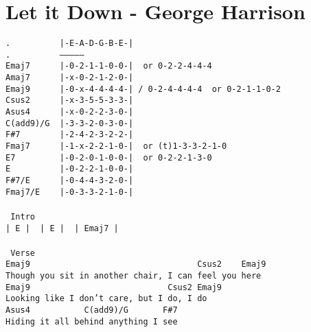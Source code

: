 \newpage
\section{Let it Down - George Harrison}
\label{Let it Down - George Harrison}
\texttt{.\ \ \ \ \ \ \ \ \ \ |-E-A-D-G-B-E-|\\
.\ \ \ \ \ \ \ \ \ \ ---------------\\
Emaj7\ \ \ \ \ \ |-0-2-1-1-0-0-|\ \ or\ 0-2-2-4-4-4\\
Amaj7\ \ \ \ \ \ |-x-0-2-1-2-0-|\\
Emaj9\ \ \ \ \ \ |-0-x-4-4-4-4-|\ /\ 0-2-4-4-4-4\ \ or\ 0-2-1-1-0-2\\
Csus2\ \ \ \ \ \ |-x-3-5-5-3-3-|\\
Asus4\ \ \ \ \ \ |-x-0-2-2-3-0-|\\
C(add9)/G\ \ |-3-3-2-0-3-0-|\\
F\#7\ \ \ \ \ \ \ \ |-2-4-2-3-2-2-|\\
Fmaj7\ \ \ \ \ \ |-1-x-2-2-1-0-|\ \ or\ (t)1-3-3-2-1-0\\
E7\ \ \ \ \ \ \ \ \ |-0-2-0-1-0-0-|\ \ or\ 0-2-2-1-3-0\\
E\ \ \ \ \ \ \ \ \ \ |-0-2-2-1-0-0-|\\
F\#7/E\ \ \ \ \ \ |-0-4-4-3-2-0-|\\
Fmaj7/E\ \ \ \ |-0-3-3-2-1-0-|\\
\\
\lbrack\ Intro\rbrack\\
|\ E\ |\ %
|\ E\ |\ %
|\ Emaj7\ |\ %
\\
\\
\lbrack\ Verse\rbrack\\
Emaj9\ \ \ \ \ \ \ \ \ \ \ \ \ \ \ \ \ \ \ \ \ \ \ \ \ \ \ \ \ \ \ \ \ \ Csus2\ \ \ \ Emaj9\\
Though\ you\ sit\ in\ another\ chair,\ I\ can\ feel\ you\ here\\
Emaj9\ \ \ \ \ \ \ \ \ \ \ \ \ \ \ \ \ \ \ \ \ \ \ \ \ \ \ \ Csus2\ Emaj9\\
Looking\ like\ I\ don't\ care,\ but\ I\ do,\ I\ do\\
Asus4\ \ \ \ \ \ \ \ \ \ \ C(add9)/G\ \ \ \ \ \ \ F\#7\\
Hiding\ it\ all\ behind\ anything\ I\ see\\
}
